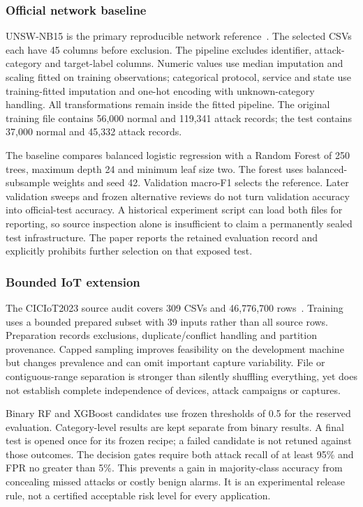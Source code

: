 \documentclass[conference,a4paper]{IEEEtran}
\begin{document}
\subsubsection{Official network baseline}
UNSW-NB15 is the primary reproducible network reference~\cite{unsw}. The selected CSVs each have 45 columns before exclusion. The pipeline excludes identifier, attack-category and target-label columns. Numeric values use median imputation and scaling fitted on training observations; categorical protocol, service and state use training-fitted imputation and one-hot encoding with unknown-category handling. All transformations remain inside the fitted pipeline. The original training file contains 56,000 normal and 119,341 attack records; the test contains 37,000 normal and 45,332 attack records.

The baseline compares balanced logistic regression with a Random Forest of 250 trees, maximum depth 24 and minimum leaf size two. The forest uses balanced-subsample weights and seed 42. Validation macro-F1 selects the reference. Later validation sweeps and frozen alternative reviews do not turn validation accuracy into official-test accuracy. A historical experiment script can load both files for reporting, so source inspection alone is insufficient to claim a permanently sealed test infrastructure. The paper reports the retained evaluation record and explicitly prohibits further selection on that exposed test.

\subsubsection{Bounded IoT extension}
The CICIoT2023 source audit covers 309 CSVs and 46,776,700 rows~\cite{ciciot}. Training uses a bounded prepared subset with 39 inputs rather than all source rows. Preparation records exclusions, duplicate/conflict handling and partition provenance. Capped sampling improves feasibility on the development machine but changes prevalence and can omit important capture variability. File or contiguous-range separation is stronger than silently shuffling everything, yet does not establish complete independence of devices, attack campaigns or captures.

Binary RF and XGBoost candidates use frozen thresholds of 0.5 for the reserved evaluation. Category-level results are kept separate from binary results. A final test is opened once for its frozen recipe; a failed candidate is not retuned against those outcomes. The decision gates require both attack recall of at least 95\% and FPR no greater than 5\%. This prevents a gain in majority-class accuracy from concealing missed attacks or costly benign alarms. It is an experimental release rule, not a certified acceptable risk level for every application.
\end{document}
